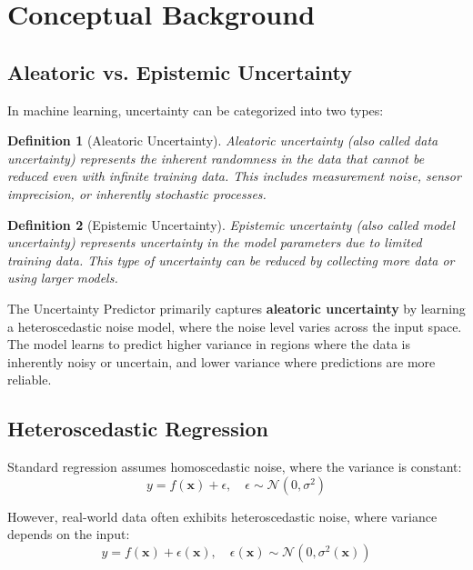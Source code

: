 \documentclass[11pt,a4paper]{article}
\newtheorem{definition}{Definition}
\begin{document}
\section{Conceptual Background}

\subsection{Aleatoric vs. Epistemic Uncertainty}

In machine learning, uncertainty can be categorized into two types:

\begin{definition}[Aleatoric Uncertainty]
Aleatoric uncertainty (also called data uncertainty) represents the inherent randomness in the data that cannot be reduced even with infinite training data. This includes measurement noise, sensor imprecision, or inherently stochastic processes.
\end{definition}

\begin{definition}[Epistemic Uncertainty]
Epistemic uncertainty (also called model uncertainty) represents uncertainty in the model parameters due to limited training data. This type of uncertainty can be reduced by collecting more data or using larger models.
\end{definition}

The Uncertainty Predictor primarily captures \textbf{aleatoric uncertainty} by learning a heteroscedastic noise model, where the noise level varies across the input space. The model learns to predict higher variance in regions where the data is inherently noisy or uncertain, and lower variance where predictions are more reliable.

\subsection{Heteroscedastic Regression}

Standard regression assumes homoscedastic noise, where the variance is constant:
\begin{equation}
y = f(\mathbf{x}) + \epsilon, \quad \epsilon \sim \mathcal{N}(0, \sigma^2)
\end{equation}

However, real-world data often exhibits heteroscedastic noise, where variance depends on the input:
\begin{equation}
y = f(\mathbf{x}) + \epsilon(\mathbf{x}), \quad \epsilon(\mathbf{x}) \sim \mathcal{N}(0, \sigma^2(\mathbf{x}))
\end{equation}
\end{document}
